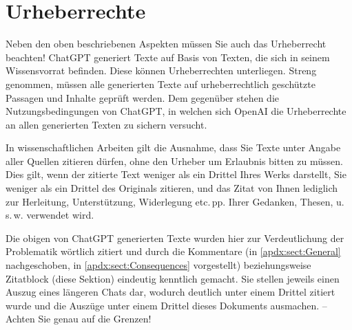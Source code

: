 \section{Urheberrechte}\label{apdx:sect:Copyright}
Neben den oben beschriebenen Aspekten müssen Sie auch das Urheberrecht beachten! Chat\-GPT generiert Texte auf Basis von Texten, die sich in seinem Wissensvorrat befinden. Diese können Urheberrechten unterliegen. Streng genommen, müssen alle generierten Texte auf urheberrechtlich geschützte Passagen und Inhalte geprüft werden. Dem gegenüber stehen die Nutzungsbedingungen von ChatGPT, in welchen sich OpenAI die Urheberrechte an allen generierten Texten zu sichern versucht.

In wissenschaftlichen Arbeiten gilt die Ausnahme, dass Sie Texte unter Angabe aller Quellen zitieren dürfen, ohne den Urheber um Erlaubnis bitten zu müssen. Dies gilt, wenn der zitierte Text weniger als ein Drittel Ihres Werks darstellt, Sie weniger als ein Drittel des Originals zitieren, und das Zitat von Ihnen lediglich zur Herleitung, Unterstützung, Widerlegung etc.\,pp. Ihrer Gedanken, Thesen, u.\,s.\,w. verwendet wird.

Die obigen von ChatGPT generierten Texte wurden hier zur Verdeutlichung der Problematik wörtlich zitiert und durch die Kommentare (in \ref{apdx:sect:General} nachgeschoben, in \ref{apdx:sect:Consequences} vorgestellt) beziehungsweise Zitatblock (diese Sektion) eindeutig kenntlich gemacht. Sie stellen jeweils einen Auszug eines längeren Chats dar, wodurch deutlich unter einem Drittel zitiert wurde und die Auszüge unter einem Drittel dieses Dokuments ausmachen. --\,Achten Sie genau auf die Grenzen!

